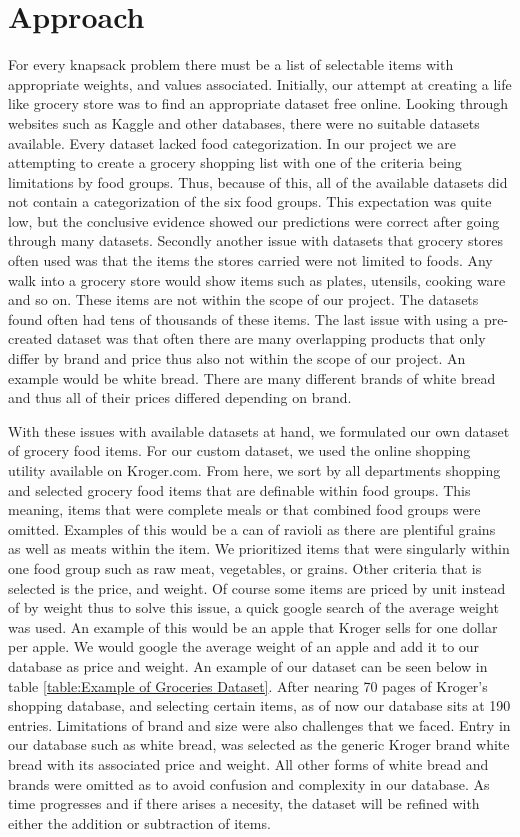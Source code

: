 \documentclass[10pt,journal,compsoc]{IEEEtran}
\begin{document}
\section{Approach}
For every knapsack problem there must be a list of selectable items with
appropriate weights, and values associated. Initially, our attempt at creating a
life like grocery store was to find an appropriate dataset free online. Looking
through websites such as Kaggle and other databases, there were no suitable
datasets available. Every dataset lacked food categorization. In our project we
are attempting to create a grocery shopping list with one of the criteria being
limitations by food groups. Thus, because of this, all of the available datasets
did not contain a categorization of the six food groups. This expectation was
quite low, but the conclusive evidence showed our predictions were correct after
going through many datasets. Secondly another issue with datasets that grocery
stores often used was that the items the stores carried were not limited to
foods. Any walk into a grocery store would show items such as plates, utensils,
cooking ware and so on. These items are not within the scope of our project. The
datasets found often had tens of thousands of these items. The last issue with
using a pre-created dataset was that often there are many overlapping products
that only differ by brand and price thus also not within the scope of our
project. An example would be white bread. There are many different brands of
white bread and thus all of their prices differed depending on brand.

With these issues with available datasets at hand, we formulated our own dataset
of grocery food items. For our custom dataset, we used the online shopping
utility available on Kroger.com. From here, we sort by all departments shopping
and selected grocery food items that are definable within food groups. This
meaning, items that were complete meals or that combined food groups were
omitted. Examples of this would be a can of ravioli as there are plentiful
grains as well as meats within the item. We prioritized items that were
singularly within one food group such as raw meat, vegetables, or grains. Other
criteria that is selected is the price, and weight. Of course some items are
priced by unit instead of by weight thus to solve this issue, a quick google
search of the average weight was used. An example of this would be an apple that
Kroger sells for one dollar per apple. We would google the average weight of an
apple and add it to our database as price and weight. An example of our dataset
can be seen below in table \ref{table:Example of Groceries Dataset}. After
nearing 70 pages of Kroger's shopping database, and selecting certain items, as
of now our database sits at 190 entries. Limitations of brand and size were also
challenges that we faced. Entry in our database such as white bread, was
selected as the generic Kroger brand white bread with its associated price and
weight. All other forms of white bread and brands were omitted as to avoid
confusion and complexity in our database. As time progresses and if there arises
a necesity, the dataset will be refined with either the addition or subtraction
of items.
\end{document}
